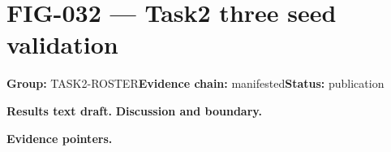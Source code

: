 \clearpage
\section{FIG-032 --- Task2 three seed validation}
\label{figpage:fig-032}
\textbf{Group:} TASK2-ROSTER\quad \textbf{Evidence chain:} manifested\quad \textbf{Status:} publication

\textbf{Results text draft.} 
\textbf{Discussion and boundary.} 


\textbf{Evidence pointers.}



\vfill
